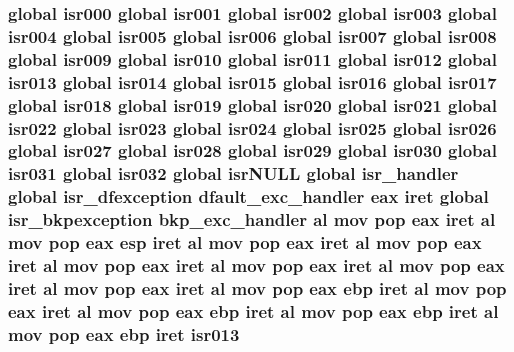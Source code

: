 \subsubsection[{\texorpdfstring{isr013}{isr013}}]{\setlength{\rightskip}{0pt plus 5cm}global {\bf isr000} global {\bf isr001} global {\bf isr002} global {\bf isr003} global {\bf isr004} global {\bf isr005} global {\bf isr006} global {\bf isr007} global {\bf isr008} global {\bf isr009} global {\bf isr010} global {\bf isr011} global {\bf isr012} global isr013 global {\bf isr014} global {\bf isr015} global {\bf isr016} global {\bf isr017} global {\bf isr018} global {\bf isr019} global {\bf isr020} global {\bf isr021} global {\bf isr022} global {\bf isr023} global {\bf isr024} global {\bf isr025} global {\bf isr026} global {\bf isr027} global {\bf isr028} global {\bf isr029} global {\bf isr030} global {\bf isr031} global isr032 global isr\+N\+U\+LL global isr\+\_\+handler global {\bf isr\+\_\+dfexception} {\bf dfault\+\_\+exc\+\_\+handler} eax iret global {\bf isr\+\_\+bkpexception} {\bf bkp\+\_\+exc\+\_\+handler} {\bf al} {\bf mov} pop eax iret {\bf al} {\bf mov} pop eax esp iret {\bf al} {\bf mov} pop eax iret {\bf al} {\bf mov} pop eax iret {\bf al} {\bf mov} pop eax iret {\bf al} {\bf mov} pop eax iret {\bf al} {\bf mov} pop eax iret {\bf al} {\bf mov} pop eax iret {\bf al} {\bf mov} pop eax ebp iret {\bf al} {\bf mov} pop eax iret {\bf al} {\bf mov} pop eax ebp iret {\bf al} {\bf mov} pop eax ebp iret {\bf al} {\bf mov} pop eax ebp iret isr013}\hypertarget{isrs_8as_a47ac6feaa050c2ab9b7afe2872cac8b7}{}\label{isrs_8as_a47ac6feaa050c2ab9b7afe2872cac8b7}
